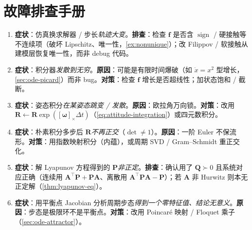 \section*{故障排查手册}
\begin{enumerate}
  \item \textbf{症状}：仿真换求解器 / 步长\emph{轨迹大变}。\textbf{排查}：检查 $\mathbf{f}$ 是否含 $\operatorname{sign}$ / 硬接触等不连续项（破坏 Lipschitz、唯一性，\cref{ex:nonunique}）；改 Filippov / 软接触从建模层恢复唯一性，而非 debug 代码。
  \item \textbf{症状}：积分器\emph{发散到无穷}。\textbf{原因}：可能是有限时间爆破（如 $\dot x=x^2$ 型增长，\cref{sec:ode-picard}）而非 bug。\textbf{对策}：检查 $\mathbf{f}$ 增长是否超线性；加状态饱和 / 截断。
  \item \textbf{症状}：姿态积分\emph{在某姿态跳变 / 发散}。\textbf{原因}：欧拉角万向锁。\textbf{对策}：改用 $\mathbf{R}\leftarrow\mathbf{R}\exp([\boldsymbol{\omega}]_\times\Delta t)$（\cref{eq:attitude-integration}）或四元数积分。
  \item \textbf{症状}：朴素积分多步后 $\mathbf{R}$\emph{不再正交}（$\det\neq1$）。\textbf{原因}：一阶 Euler 不保流形。\textbf{对策}：用指数映射积分（内蕴），或周期 SVD / Gram--Schmidt 重正交化。
  \item \textbf{症状}：解 Lyapunov 方程得到的 $\mathbf{P}$\emph{非正定}。\textbf{排查}：确认用了 $\mathbf{Q}\succ0$ 且系统对应正确（连续用 $\mathbf{A}^\top\mathbf{P}+\mathbf{P}\mathbf{A}$、离散用 $\mathbf{A}^\top\mathbf{P}\mathbf{A}-\mathbf{P}$）；若 $\mathbf{A}$ 非 Hurwitz 则本无正定解（\cref{thm:lyapunov-eq}）。
  \item \textbf{症状}：用平衡点 Jacobian 分析周期步态\emph{得到一个零特征值、结论无意义}。\textbf{原因}：步态是极限环不是平衡点。\textbf{对策}：改用 Poincaré 映射 / Floquet 乘子（\cref{sec:ode-attractor}）。
\end{enumerate}
